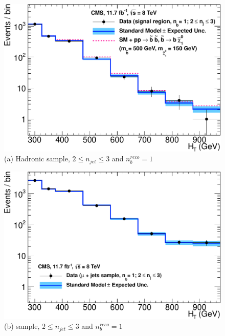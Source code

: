 \begin{figure}[ht]
\footnotesize
\centering
\begin{minipage}[b]{0.48 \linewidth}
\includegraphics[width = 1.0\linewidth]{plots/hadronic_1b_le3j_logy.pdf}
\centering (a)  Hadronic sample, $2 \leq n_{jet} \leq 3$ and $n_{b}^{reco} = 1$ 
\end{minipage}
\quad
\begin{minipage}[b]{0.48\linewidth}
\includegraphics[width = 1.0\linewidth]{plots/muon_1b_le3j_logy.pdf}
\centering (b)  \mupjets sample, $2 \leq n_{jet} \leq 3$ and $n_{b}^{reco} = 1$  
\end{minipage} \\
\vspace{0.4cm}
\begin{minipage}[b]{0.48 \linewidth}

\end{minipage}
\end{figure}
